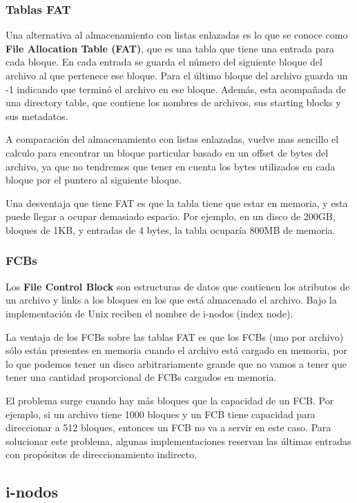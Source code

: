 \documentclass{article}
\begin{document}
\subsubsection{Tablas FAT}

Una alternativa al almacenamiento con listas enlazadas es lo que se conoce como \textbf{File Allocation Table (FAT)}, que es una tabla que tiene una entrada para cada bloque. En cada entrada se guarda el n\'umero del siguiente bloque del archivo al que pertenece ese bloque. Para el \'ultimo bloque del archivo guarda un -1 indicando que termin\'o el archivo en ese bloque. Además, esta acompañada de una directory table, que contiene los nombres de archivos, sus starting blocks y sus metadatos.

A comparación del almacenamiento con listas enlazadas, vuelve mas sencillo el calculo para encontrar un bloque particular basado en un offset de bytes del archivo, ya que no tendremos que tener en cuenta los bytes utilizados en cada bloque por el puntero al siguiente bloque.

Una desventaja que tiene FAT es que la tabla tiene que estar en memoria, y esta puede llegar a ocupar demasiado espacio. Por ejemplo, en un disco de 200GB, bloques de 1KB, y entradas de 4 bytes, la tabla ocupar\'ia 800MB de memoria.

\subsubsection{FCBs}

Los \textbf{File Control Block} son estructuras de datos que contienen los atributos de un archivo y links a los bloques en los que est\'a almacenado el archivo. Bajo la implementación de Unix reciben el nombre de i-nodos (index node).

La ventaja de los FCBs sobre las tablas FAT es que los FCBs (uno por archivo) s\'olo est\'an presentes en memoria cuando el archivo est\'a cargado en memoria, por lo que podemos tener un disco arbitrariamente grande que no vamos a tener que tener una cantidad proporcional de FCBs cargados en memoria.

El problema surge cuando hay m\'as bloques que la capacidad de un FCB. Por ejemplo, si un archivo tiene 1000 bloques y un FCB tiene capacidad para direccionar a 512 bloques, entonces un FCB no va a servir en este caso. Para solucionar este problema, algunas implementaciones reservan las \'ultimas entradas con propósitos de direccionamiento indirecto.

\subsection{i-nodos}
\end{document}

